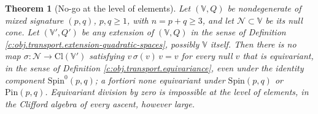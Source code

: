 \documentclass[11pt]{article}
\newtheorem{theorem}{Theorem}[section]
\theoremstyle{definition}
\theoremstyle{plain}
\providecommand{\Cl}{}\renewcommand{\Cl}{\mathrm{Cl}}
\providecommand{\Ncone}{}\renewcommand{\Ncone}{\mathcal{N}}
\providecommand{\Pin}{}\renewcommand{\Pin}{\mathrm{Pin}}
\providecommand{\Spin}{}\renewcommand{\Spin}{\mathrm{Spin}}
\begin{document}
\begin{theorem}[No-go at the level of elements]\label{c:transport.no-go-level-elements}
Let $(\mathbb{V}, Q)$ be nondegenerate of mixed signature $(p,q)$, $p, q \geq 1$, with $n = p + q \geq 3$, and let $\Ncone \subset \mathbb{V}$ be its null cone. Let $(\mathbb{V}', Q')$ be \emph{any} extension of $(\mathbb{V}, Q)$ in the sense of Definition \ref{c:obj.transport.extension-quadratic-spaces}, possibly $\mathbb{V}$ itself. Then there is no map $\sigma : \Ncone \to \Cl(\mathbb{V}')$ satisfying $v\,\sigma(v)\,v = v$ for every null $v$ that is equivariant, in the sense of Definition \ref{c:obj.transport.equivariance}, even under the identity component $\Spin^0(p,q)$; a fortiori none equivariant under $\Spin(p,q)$ or $\Pin(p,q)$. Equivariant division by zero is impossible at the level of elements, in the Clifford algebra of every ascent, however large.
\end{theorem}
\end{document}
